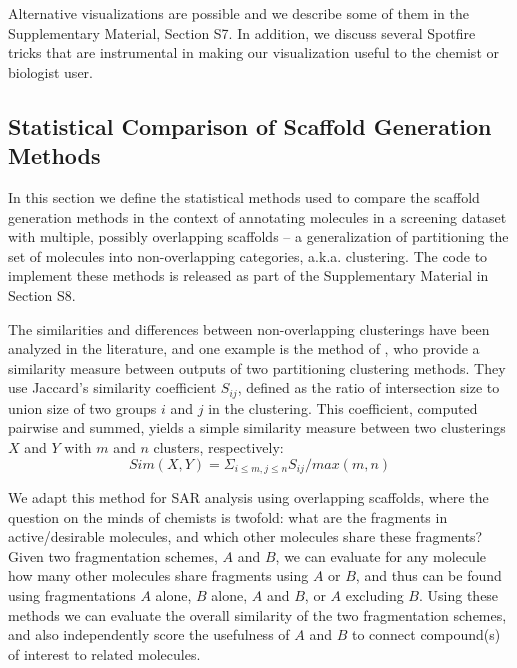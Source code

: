 \documentclass[journal=jacsat,biochem,manuscript=article]{achemso}
\begin{document}
Alternative visualizations are possible and we describe some of them
in the Supplementary Material, Section S7. In addition, we discuss several
Spotfire tricks that are instrumental in making our visualization
useful to the chemist or biologist
user. %

\subsection{Statistical Comparison of Scaffold Generation Methods}
\label{sec:statmethod}
In this section we define the statistical methods used to compare the
scaffold generation methods in the context of annotating molecules in
a screening dataset with multiple, possibly overlapping scaffolds -- a
generalization of partitioning the set of molecules into non-overlapping
categories, a.k.a. clustering. The code to implement these methods is released
as part of the Supplementary Material in Section S8.

The similarities and differences between non-overlapping clusterings
have been analyzed in the literature, and one example is the method of
\citet{Torres2009}, who provide a similarity measure between
outputs of two partitioning clustering methods. They use Jaccard's
similarity coefficient $S_{ij}$, defined as the ratio of intersection
size to union size of two groups $i$ and $j$ in the clustering.  This
coefficient, computed pairwise and summed, yields a simple similarity
measure between two clusterings $X$ and $Y$ with $m$ and $n$ clusters,
respectively:
\begin{equation}
Sim(X,Y) = \Sigma_{i \le m, j \le n}{S_{ij} / max(m,n)}
\end{equation}

We adapt this method for SAR analysis using overlapping scaffolds,
where the question on the minds of chemists is twofold: what are the
fragments in active/desirable molecules, and which other molecules
share these fragments? Given two fragmentation schemes, $A$ and $B$,
we can evaluate for any molecule how many other molecules share
fragments using $A$ or $B$, and thus can be found using fragmentations
$A$ alone, $B$ alone, $A$ and $B$, or $A$ excluding $B$.  Using these
methods we can evaluate the overall similarity of the two
fragmentation schemes, and also independently score the usefulness of
$A$ and $B$ to connect compound(s) of interest to related molecules. 
\end{document}
